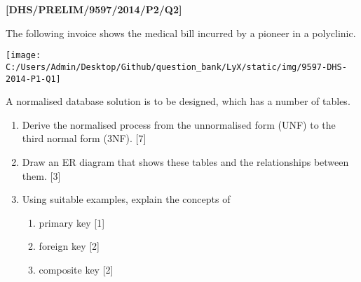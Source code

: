 \item \textbf{{[}DHS/PRELIM/9597/2014/P2/Q2{]} }

The following invoice shows the medical bill incurred by a pioneer
in a polyclinic. 
\begin{center}
\texttt{[image: C:/Users/Admin/Desktop/Github/question\_bank/LyX/static/img/9597-DHS-2014-P1-Q1]}
\par\end{center}

A normalised database solution is to be designed, which has a number
of tables.
\begin{enumerate}
\item Derive the normalised process from the unnormalised form (UNF) to
the third normal form (3NF). \hfill{}{[}7{]}
\item Draw an ER diagram that shows these tables and the relationships between
them. \hfill{}{[}3{]}
\item Using suitable examples, explain the concepts of 
\begin{enumerate}
\item primary key \hfill{}{[}1{]}
\item foreign key \hfill{}{[}2{]}
\item composite key \hfill{}{[}2{]}
\end{enumerate}
\end{enumerate}